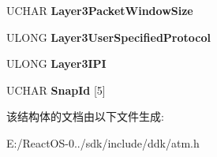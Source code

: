 \begin{DoxyCompactItemize}
U\+C\+H\+AR {\bfseries Layer3\+Packet\+Window\+Size}
\item 
\mbox{\label{struct___a_t_m___b_l_l_i___i_e_a676668991e15f441c431d40ecdc4ec21}} 
U\+L\+O\+NG {\bfseries Layer3\+User\+Specified\+Protocol}
\item 
\mbox{\label{struct___a_t_m___b_l_l_i___i_e_a28fd5a9f14bd6bc9643212635bedaf2a}} 
U\+L\+O\+NG {\bfseries Layer3\+I\+PI}
\item 
\mbox{\label{struct___a_t_m___b_l_l_i___i_e_a6e11ff5b183b7a92466ffbf00261b839}} 
U\+C\+H\+AR {\bfseries Snap\+Id} \mbox{[}5\mbox{]}
\end{DoxyCompactItemize}


该结构体的文档由以下文件生成\+:\begin{DoxyCompactItemize}
\item 
E\+:/\+React\+O\+S-\/0../sdk/include/ddk/atm.\+h\end{DoxyCompactItemize}
